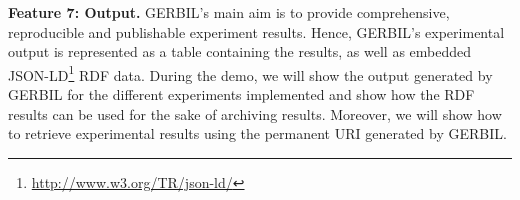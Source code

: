 \textbf{Feature 7: Output.}
\label{sec:output}
GERBIL's main aim is to provide comprehensive, reproducible and publishable experiment results.
Hence, GERBIL's experimental output is represented as a table containing the results, as well as embedded JSON-LD\footnote{\url{http://www.w3.org/TR/json-ld/}} RDF data. During the demo, we will show the output generated by GERBIL for the different experiments implemented and show how the RDF results can be used for the sake of archiving  results. Moreover, we will show how to retrieve experimental results using the permanent URI generated by GERBIL. %




